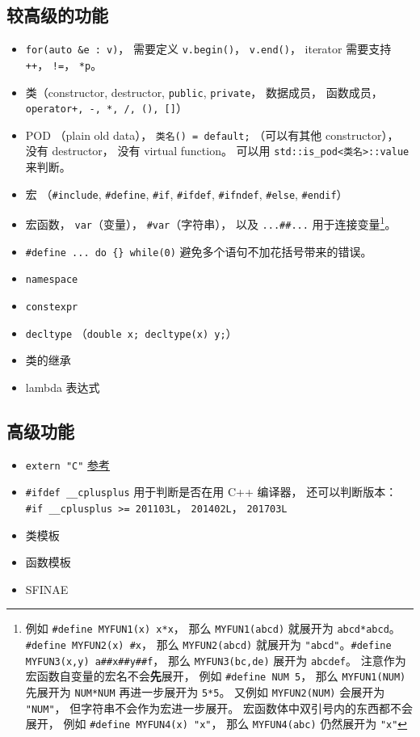 \subsection{较高级的功能}
\begin{itemize}
\item \verb|for(auto &e : v)|， 需要定义 \verb|v.begin()|， \verb|v.end()|， iterator 需要支持 \verb|++|， \verb|!=|， \verb|*p|。
\item 类（constructor, destructor, \verb|public|, \verb|private|， 数据成员， 函数成员， \verb|operator+, -, *, /, (), []|）
\item POD （plain old data）， \verb|类名() = default;| （可以有其他 constructor）， 没有 destructor， 没有 virtual function。 可以用 \verb|std::is_pod<类名>::value| 来判断。
\item 宏 （\verb|#include|, \verb|#define|, \verb|#if|, \verb|#ifdef|, \verb|#ifndef|, \verb|#else|, \verb|#endif|）
\item 宏函数， \verb|var|（变量）， \verb|#var|（字符串）， 以及 \verb|...##...| 用于连接变量\footnote{例如 \verb|#define MYFUN1(x) x*x|， 那么 \verb|MYFUN1(abcd)| 就展开为 \verb|abcd*abcd|。 \verb|#define MYFUN2(x) #x|， 那么 \verb|MYFUN2(abcd)| 就展开为 \verb|"abcd"|。\verb|#define MYFUN3(x,y) a##x##y##f|， 那么 \verb|MYFUN3(bc,de)| 展开为 \verb|abcdef|。 注意作为宏函数自变量的宏名不会\textbf{先}展开， 例如 \verb|#define NUM 5|， 那么 \verb|MYFUN1(NUM)| 先展开为 \verb|NUM*NUM| 再进一步展开为 \verb|5*5|。 又例如 \verb|MYFUN2(NUM)| 会展开为 \verb|"NUM"|， 但字符串不会作为宏进一步展开。 宏函数体中双引号内的东西都不会展开， 例如 \verb|#define MYFUN4(x) "x"|， 那么 \verb|MYFUN4(abc)| 仍然展开为 \verb|"x"|}。
\item \verb|#define ... do {} while(0)| 避免多个语句不加花括号带来的错误。
\item \verb|namespace|
\item \verb|constexpr|
\item \verb|decltype| （\verb|double x; decltype(x) y;|）
\item 类的继承
\item lambda 表达式
\end{itemize}

\subsection{高级功能}
\begin{itemize}
\item \verb|extern "C"| \href{https://www.geeksforgeeks.org/extern-c-in-c/}{参考}
\item \verb|#ifdef __cplusplus| 用于判断是否在用 C++ 编译器， 还可以判断版本： \verb|#if __cplusplus >= 201103L|， \verb|201402L|， \verb|201703L|
\item 类模板
\item 函数模板
\item SFINAE
\end{itemize}
